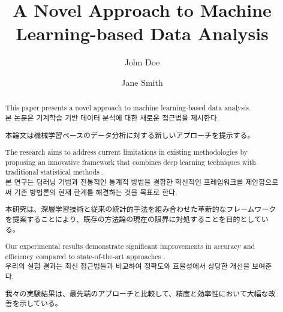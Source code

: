 \documentclass[preprint,12pt]{elsarticle}
\begin{document}
\begin{frontmatter}

\title{A Novel Approach to Machine Learning-based Data Analysis}

\author[label1]{John Doe}

\author[label2]{Jane Smith}



\begin{abstract}
This paper presents a novel approach to machine learning-based data analysis. \\
본 논문은 기계학습 기반 데이터 분석에 대한 새로운 접근법을 제시한다. \\
\begin{CJK}{UTF8}{min}
本論文は機械学習ベースのデータ分析に対する新しいアプローチを提示する。
\end{CJK}

The research aims to address current limitations in existing methodologies by proposing an innovative framework that combines deep learning techniques with traditional statistical methods \cite{lecun2015deep}. \\
본 연구는 딥러닝 기법과 전통적인 통계적 방법을 결합한 혁신적인 프레임워크를 제안함으로써 기존 방법론의 현재 한계를 해결하는 것을 목표로 한다. \\
\begin{CJK}{UTF8}{min}
本研究は、深層学習技術と従来の統計的手法を組み合わせた革新的なフレームワークを提案することにより、既存の方法論の現在の限界に対処することを目的としている。
\end{CJK}

Our experimental results demonstrate significant improvements in accuracy and efficiency compared to state-of-the-art approaches \cite{goodfellow2016deep}. \\
우리의 실험 결과는 최신 접근법들과 비교하여 정확도와 효율성에서 상당한 개선을 보여준다. \\
\begin{CJK}{UTF8}{min}
我々の実験結果は、最先端のアプローチと比較して、精度と効率性において大幅な改善を示している。
\end{CJK}


\end{abstract}
\end{frontmatter}
\end{document}
